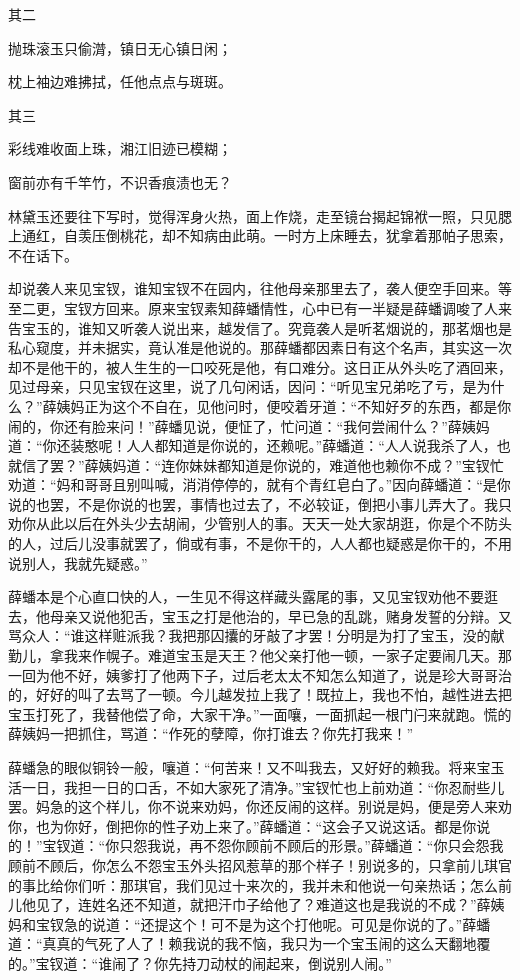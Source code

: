 其二

抛珠滚玉只偷潸，镇日无心镇日闲；

枕上袖边难拂拭，任他点点与斑斑。

其三

彩线难收面上珠，湘江旧迹已模糊；

窗前亦有千竿竹，不识香痕渍也无？

林黛玉还要往下写时，觉得浑身火热，面上作烧，走至镜台揭起锦袱一照，只见腮上通红，自羡压倒桃花，却不知病由此萌。一时方上床睡去，犹拿着那帕子思索，不在话下。

却说袭人来见宝钗，谁知宝钗不在园内，往他母亲那里去了，袭人便空手回来。等至二更，宝钗方回来。原来宝钗素知薛蟠情性，心中已有一半疑是薛蟠调唆了人来告宝玉的，谁知又听袭人说出来，越发信了。究竟袭人是听茗烟说的，那茗烟也是私心窥度，并未据实，竟认准是他说的。那薛蟠都因素日有这个名声，其实这一次却不是他干的，被人生生的一口咬死是他，有口难分。这日正从外头吃了酒回来，见过母亲，只见宝钗在这里，说了几句闲话，因问：``听见宝兄弟吃了亏，是为什么？''薛姨妈正为这个不自在，见他问时，便咬着牙道：``不知好歹的东西，都是你闹的，你还有脸来问！''薛蟠见说，便怔了，忙问道：``我何尝闹什么？''薛姨妈道：``你还装憨呢！人人都知道是你说的，还赖呢。''薛蟠道：``人人说我杀了人，也就信了罢？''薛姨妈道：``连你妹妹都知道是你说的，难道他也赖你不成？''宝钗忙劝道：``妈和哥哥且别叫喊，消消停停的，就有个青红皂白了。''因向薛蟠道：``是你说的也罢，不是你说的也罢，事情也过去了，不必较证，倒把小事儿弄大了。我只劝你从此以后在外头少去胡闹，少管别人的事。天天一处大家胡逛，你是个不防头的人，过后儿没事就罢了，倘或有事，不是你干的，人人都也疑惑是你干的，不用说别人，我就先疑惑。''

薛蟠本是个心直口快的人，一生见不得这样藏头露尾的事，又见宝钗劝他不要逛去，他母亲又说他犯舌，宝玉之打是他治的，早已急的乱跳，赌身发誓的分辩。又骂众人：``谁这样赃派我？我把那囚攮的牙敲了才罢！分明是为打了宝玉，没的献勤儿，拿我来作幌子。难道宝玉是天王？他父亲打他一顿，一家子定要闹几天。那一回为他不好，姨爹打了他两下子，过后老太太不知怎么知道了，说是珍大哥哥治的，好好的叫了去骂了一顿。今儿越发拉上我了！既拉上，我也不怕，越性进去把宝玉打死了，我替他偿了命，大家干净。''一面嚷，一面抓起一根门闩来就跑。慌的薛姨妈一把抓住，骂道：``作死的孽障，你打谁去？你先打我来！''

薛蟠急的眼似铜铃一般，嚷道：``何苦来！又不叫我去，又好好的赖我。将来宝玉活一日，我担一日的口舌，不如大家死了清净。''宝钗忙也上前劝道：``你忍耐些儿罢。妈急的这个样儿，你不说来劝妈，你还反闹的这样。别说是妈，便是旁人来劝你，也为你好，倒把你的性子劝上来了。''薛蟠道：``这会子又说这话。都是你说的！''宝钗道：``你只怨我说，再不怨你顾前不顾后的形景。''薛蟠道：``你只会怨我顾前不顾后，你怎么不怨宝玉外头招风惹草的那个样子！别说多的，只拿前儿琪官的事比给你们听：那琪官，我们见过十来次的，我并未和他说一句亲热话；怎么前儿他见了，连姓名还不知道，就把汗巾子给他了？难道这也是我说的不成？''薛姨妈和宝钗急的说道：``还提这个！可不是为这个打他呢。可见是你说的了。''薛蟠道：``真真的气死了人了！赖我说的我不恼，我只为一个宝玉闹的这么天翻地覆的。''宝钗道：``谁闹了？你先持刀动杖的闹起来，倒说别人闹。''

